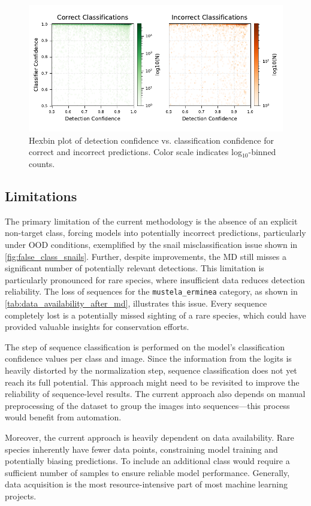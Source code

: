 \begin{figure}[ht]
\centering
\includegraphics{figures/pred_conf_hexbin.pdf}
\caption{Hexbin plot of detection confidence vs. classification confidence for correct and incorrect predictions. Color scale indicates log$_{10}$-binned counts.}
\label{fig:pred_conf_hexbin}
\end{figure}

\subsection{Limitations}
The primary limitation of the current methodology is the absence of an explicit non-target class, forcing models into potentially incorrect predictions, particularly under \ac{OOD} conditions, exemplified by the snail misclassification issue shown in \autoref{fig:false_class_snails}.
Further, despite improvements, the \ac{MD} still misses a significant number of potentially relevant detections.
This limitation is particularly pronounced for rare species, where insufficient data reduces detection reliability.
The loss of sequences for the \texttt{mustela\_erminea} category, as shown in \autoref{tab:data_availability_after_md}, illustrates this issue.
Every sequence completely lost is a potentially missed sighting of a rare species, which could have provided valuable insights for conservation efforts.

The step of sequence classification is performed on the model's classification confidence values per class and image.
Since the information from the logits is heavily distorted by the normalization step, sequence classification does not yet reach its full potential.
This approach might need to be revisited to improve the reliability of sequence-level results.
The current approach also depends on manual preprocessing of the dataset to group the images into sequences---this process would benefit from automation.

Moreover, the current approach is heavily dependent on data availability.
Rare species inherently have fewer data points, constraining model training and potentially biasing predictions.
To include an additional class would require a sufficient number of samples to ensure reliable model performance.
Generally, data acquisition is the most resource-intensive part of most machine learning projects.

